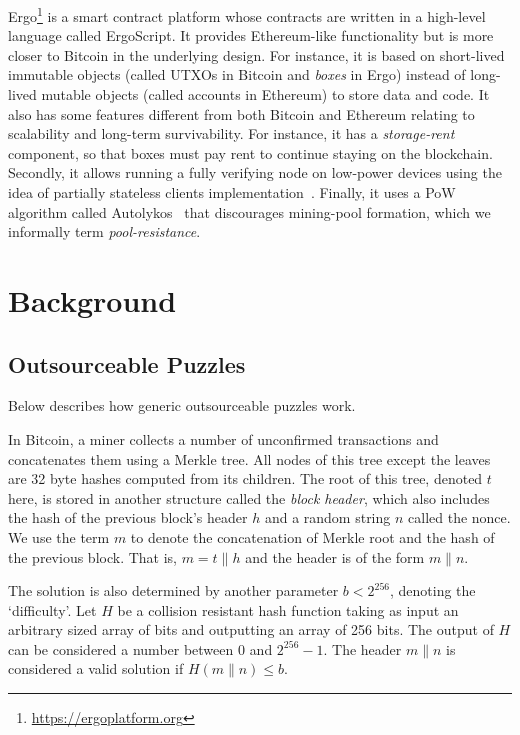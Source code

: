 \documentclass[11pt]{article}
\newcommand{\authnote}[2]{\marginpar{\parbox{\marginparwidth}{\tiny %
  \textsf{#1 {\textcolor{blue}{notes: #2}}}}}%
  \textcolor{blue}{\textbf{\dag}}}
\newcommand{\authnote}[2]{
  \textsf{#1 \textcolor{blue}{: #2}}}
\newcommand{\authnote}[2]{}
\newcommand{\snote}[1]{{\authnote{\textcolor{yellow}{Scalahub notes}}{#1}}}
\newcommand{\langname}{ErgoScript\xspace}
\newcommand{\powname}{Autolykos\xspace}
\begin{document}
\snote{Below text copied from PoW intro paper}

Ergo\footnote{\url{https://ergoplatform.org}} is a smart contract platform whose contracts are written in a high-level language called \langname. It provides Ethereum-like functionality but is more closer to Bitcoin in the underlying design. For instance, it is based on short-lived immutable objects (called UTXOs in Bitcoin and {\em boxes} in Ergo) instead of long-lived mutable objects (called accounts in Ethereum) to store data and code. It also has some features different from both Bitcoin and Ethereum relating to scalability and long-term survivability. For instance, it has a {\em storage-rent} component, so that boxes must pay rent to continue staying on the blockchain. Secondly, it allows running a fully verifying node on low-power devices using the idea of partially stateless clients implementation~\cite{RMCI17}. Finally, it uses a PoW algorithm called \powname~\cite{autolykos} that discourages mining-pool formation, which we informally term {\em pool-resistance}. 

\section{Background}
\subsection{Outsourceable Puzzles}

Below describes how generic outsourceable puzzles work. 

\snote{Following is more or less copy-pasted from PoW intro paper. Needs rework}


In Bitcoin, a miner collects a number of unconfirmed transactions and concatenates them using a Merkle tree. All nodes of this tree except the leaves are 32 byte hashes computed from its children. The root of this tree, denoted $t$ here, is stored in another structure called the {\em block header}, which also includes the hash of the previous block's header $h$ and a random string $n$ called the nonce. We use the term $m$ to denote the concatenation of Merkle root and the hash of the previous block. 
That is, $m = t\|h$ and the header is of the form $m\|n$. 

The solution is also determined by another parameter $b < 2^{256}$, denoting the `difficulty'. Let $H$ be a collision resistant hash function taking as input an arbitrary sized array of bits and outputting an array of 256 bits. The output of $H$ can be considered a number between 0 and $2^{256}-1$. The header $m\|n$ is considered a valid solution if $H(m\|n) \leq b$. 
\end{document}
